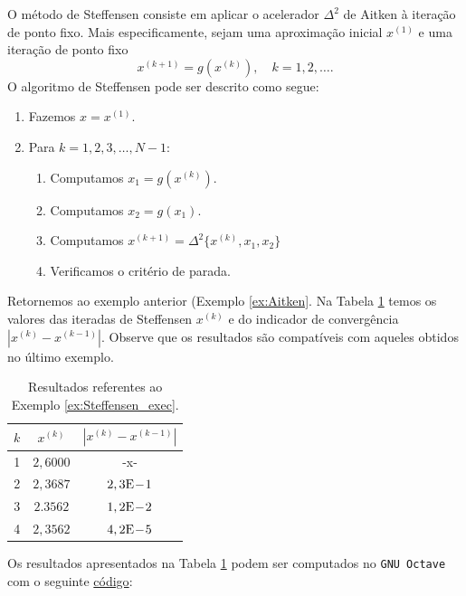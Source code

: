 O método de Steffensen consiste em aplicar o acelerador $\Delta^2$ de Aitken à iteração de ponto fixo. Mais especificamente, sejam uma aproximação inicial $x^{(1)}$ e uma iteração de ponto fixo
\begin{equation}
  x^{(k+1)} = g(x^{(k)}),\quad k=1,2,\ldots.
\end{equation}
O algoritmo de Steffensen pode ser descrito como segue:
\begin{enumerate}
\item Fazemos $x = x^{(1)}$.
\item Para $k=1,2,3,\dotsc, N-1$:
  \begin{enumerate}
  \item Computamos $x_1 = g(x^{(k)})$.
  \item Computamos $x_2 = g(x_1)$.
  \item Computamos $x^{(k+1)} = \Delta^2\{x^{(k)},x_1,x_2\}$
  \item Verificamos o critério de parada.
  \end{enumerate}
\end{enumerate}


\begin{ex}\label{ex:Steffensen_exec}
  Retornemos ao exemplo anterior (Exemplo \ref{ex:Aitken}. Na Tabela \ref{tab:ex_Steffensen_exec} temos os valores das iteradas de Steffensen $x^{(k)}$ e do indicador de convergência $|x^{(k)}-x^{(k-1)}|$. Observe que os resultados são compatíveis com aqueles obtidos no último exemplo.

\begin{table}[h!]
  \centering
  \caption{Resultados referentes ao Exemplo \ref{ex:Steffensen_exec}.}
  \label{tab:ex_Steffensen_exec}
  \begin{tabular}{r|cc}
    $k$ & $x^{(k)}$ & $|x^{(k)}-x^{(k-1)}|$ \\\hline
    1 & $2,6000$ & -x- \\
    2 & $2,3687$ & $2,3\mathrm{E}\!-\!1$ \\
    3 & $2.3562$ & $1,2\mathrm{E}\!-\!2$ \\
    4 & $2,3562$ & $4,2\mathrm{E}\!-\!5$ \\\hline
  \end{tabular}
\end{table}

\ifisoctave
Os resultados apresentados na Tabela \ref{tab:ex_Steffensen_exec} podem ser computados no \verb+GNU Octave+ com o seguinte \href{https://github.com/phkonzen/notas/blob/master/src/MatematicaNumerica/cap_eq1d/dados/ex_Steffensen_exec/ex_Steffensen_exec.m}{código}:

\fi
\end{ex}

